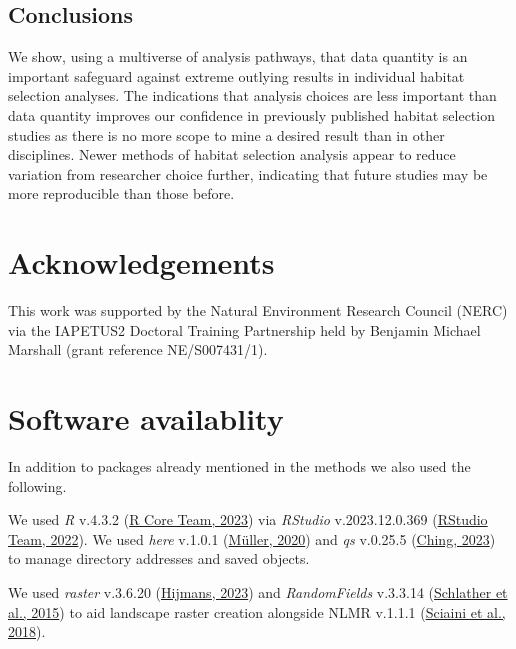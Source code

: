 \documentclass[10pt,a4paper]{article}
\begin{document}
\hypertarget{conclusions}{%
\subsection{Conclusions}\label{conclusions}}

We show, using a multiverse of analysis pathways, that data quantity is an important safeguard against extreme outlying results in individual habitat selection analyses.
The indications that analysis choices are less important than data quantity improves our confidence in previously published habitat selection studies as there is no more scope to mine a desired result than in other disciplines.
Newer methods of habitat selection analysis appear to reduce variation from researcher choice further, indicating that future studies may be more reproducible than those before.

\clearpage

\hypertarget{acknowledgements}{%
\section{Acknowledgements}\label{acknowledgements}}

This work was supported by the Natural Environment Research Council (NERC) via the IAPETUS2 Doctoral Training Partnership held by Benjamin Michael Marshall (grant reference NE/S007431/1).

\hypertarget{software-availablity}{%
\section{Software availablity}\label{software-availablity}}

In addition to packages already mentioned in the methods we also used the following.

We used \emph{R} v.4.3.2 (\protect\hyperlink{ref-base}{R Core Team, 2023}) via \emph{RStudio} v.2023.12.0.369 (\protect\hyperlink{ref-rstudio}{RStudio Team, 2022}).
We used \emph{here} v.1.0.1 (\protect\hyperlink{ref-here}{Müller, 2020}) and \emph{qs} v.0.25.5 (\protect\hyperlink{ref-qs}{Ching, 2023}) to manage directory addresses and saved objects.

We used \emph{raster} v.3.6.20 (\protect\hyperlink{ref-raster}{Hijmans, 2023}) and \emph{RandomFields} v.3.3.14 (\protect\hyperlink{ref-RandomFields}{Schlather et al., 2015}) to aid landscape raster creation alongside NLMR v.1.1.1 (\protect\hyperlink{ref-NLMR}{Sciaini et al., 2018}).
\end{document}
